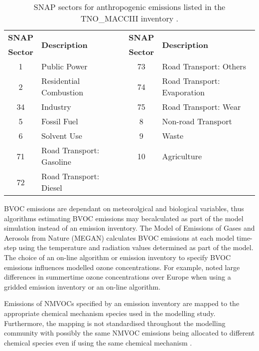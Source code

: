 \begin{table}[t]
    \centering
    \caption[SNAP sectors in the TNO\_MACCIII]{SNAP sectors for anthropogenic emissions listed in the TNO\_MACCIII inventory \citep{Kuenen:2014}.}
    \begin{tabular}{clcl}
        \hline \hline
        \textbf{SNAP} & \multirow{2}{*}{\textbf{Description}} & \textbf{SNAP} & \multirow{2}{*}{\textbf{Description}} \\
        \textbf{Sector} & & \textbf{Sector} & \\
        \hline \hline
        1 & Public Power & 73 & Road Transport: Others \\
        2 & Residential Combustion & 74 & Road Transport: Evaporation \\
        34 & Industry & 75 & Road Transport: Wear \\
        5 & Fossil Fuel & 8 & Non-road Transport \\
        6 & Solvent Use & 9 & Waste \\
        71 & Road Transport: Gasoline & 10 & Agriculture \\
        72 & Road Transport: Diesel & & \\ 
        \hline \hline
    \end{tabular}
    \label{t:SNAP}
\end{table}

BVOC emissions are dependant on meteorolgical and biological variables, thus algorithms estimating BVOC emissions may becalculated as part of the model simulation instead of an emission inventory.
The Model of Emissions of Gases and Aerosols from Nature (MEGAN) \citep{Guenther:2006, Guenther:2012} calculates BVOC emissions at each model time-step using the temperature and radiation values determined as part of the model.
The choice of an on-line algorithm or emission inventory to specify BVOC emissions influences modelled ozone concentrations. 
For example, \citet{Curci:2009} noted large differences in summertime ozone concentrations over Europe when using a gridded emission inventory or an on-line algorithm.

Emissions of NMVOCs specified by an emission inventory are mapped to the appropriate chemical mechanism species used in the modelling study.
Furthermore, the mapping is not standardised throughout the modelling community with possibly the same NMVOC emissions being allocated to different chemical species even if using the same chemical mechanism \citep{Carter:2015}.

